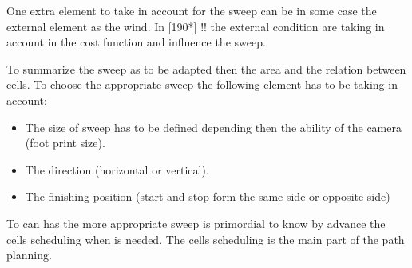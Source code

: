 	One extra element to take in account for the sweep can be in some case the external element as the wind. In \citep{215*lee2010,190*hsu2014 }[190*] !! the external condition are taking in account in the cost function and influence the sweep.
	
	
	To summarize the sweep as to be adapted then the area and the relation between cells. To choose the appropriate sweep the following element has to be taking in account:
	\begin{itemize}
		\item The size of  sweep  has to be defined depending then the ability of the camera (foot print size).
		\item The direction (horizontal or vertical).
		\item The finishing  position (start and stop form the same side or opposite side)
	\end{itemize}
To  can has the more appropriate sweep is primordial to know by advance  the cells scheduling when is needed. The cells scheduling is the main part of the path planning.

	
	 

	 
	
